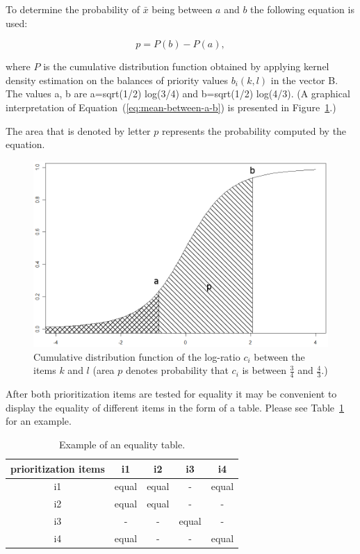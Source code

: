To determine the probability of $\bar{x}$ being between $a$ and $b$ the following equation is used:

\begin{equation}
	p=P(b)-P(a)\label{eq:mean-between-a-b},
\end{equation}

where $P$ is the cumulative distribution function obtained by applying 
kernel density estimation on the balances of priority values $b_i(k,l)$ in the vector B.
The values a, b are a=sqrt(1/2) log(3/4) and b=sqrt(1/2) log(4/3).
(A graphical interpretation of Equation~(\ref{eq:mean-between-a-b}) is presented in Figure~\ref{fig:Probability-p-that}.)


The area that is denoted by letter $p$ represents the probability computed by the equation.

\begin{figure}
	\center
\includegraphics[scale=0.2]{fig/p}
\caption{
	\label{fig:Probability-p-that}
	Cumulative distribution function of the log-ratio $c_{i}$ between the items $k$ and $l$ (area $p$ denotes probability that $c_{i}$ is between $\frac{3}{4}$ and $\frac{4}{3}$.)
}
\end{figure}

After both prioritization items are tested for equality it may
be convenient to display the equality of different items in the form of a table.
Please see Table~\ref{tab:ECVexample} for an example.

\begin{table}
	\scriptsize
	\centering
\caption{Example of an equality table.}

\label{tab:ECVexample}
\begin{tabular}{|c|c|c|c|c|}
\hline 
prioritization items & i1 & i2 & i3 & i4\tabularnewline
\hline\hline 
i1 & equal & equal & - & equal\tabularnewline
\hline 
i2 & equal & equal & - & -\tabularnewline
\hline 
i3 & - & - & equal & -\tabularnewline
\hline 
i4 & equal & - & - & equal\tabularnewline
\hline
\end{tabular}
\end{table}

